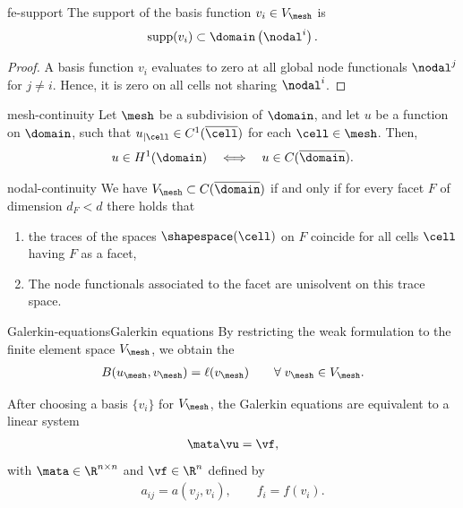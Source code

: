 \begin{Lemma}{fe-support}
  The support of the basis function $v_i\in V_\mesh$ is
  \begin{gather*}
    \operatorname{supp}(v_i) \subset \domain\left(\nodal^i\right).
  \end{gather*}
\end{Lemma}

\begin{proof}
  A basis function $v_i$ evaluates to zero at all global node
  functionals $\nodal^j$ for $j\neq i$. Hence, it is zero on all cells
  not sharing $\nodal^i$.
\end{proof}

\begin{Lemma}{mesh-continuity}
  Let $\mesh$ be a subdivision of $\domain$, and let $u$ be a function
  on $\domain$, such that $u_{|\cell} \in C^1(\overline{\cell})$ for
  each $\cell\in\mesh$. Then,
  \begin{gather}
    u\in H^1(\domain)
    \quad \Longleftrightarrow\quad
    u\in C(\overline\domain).
  \end{gather}
\end{Lemma}

\begin{Lemma}{nodal-continuity}
  We have $V_\mesh\subset C(\overline{\domain})$ if and only if for
  every facet $F$ of dimension $d_F < d$ there holds that
  \begin{enumerate}
  \item the traces of the spaces $\shapespace(\cell)$ on $F$ coincide
    for all cells $\cell$ having $F$ as a facet,
  \item The node functionals associated to the facet are unisolvent on
    this trace space.
  \end{enumerate}
\end{Lemma}

\begin{Definition}{Galerkin-equations}{Galerkin equations}
  By restricting the weak formulation to the finite element space $V_{\mesh}$, we obtain the 
  \begin{gather}
    B(u_{\mesh},v_{\mesh}) = \ell(v_{\mesh}) \qquad\forall\;v_{\mesh}\in V_{\mesh}. 
  \end{gather}
  
  After choosing a basis $\{v_i\}$ for $V_{\mesh}$, the Galerkin equations are
  equivalent to a linear system
  \begin{gather}
    \mata \vu = \vf,
  \end{gather}
  with $\mata\in\R^{n\times n}$ and $\vf\in \R^n$ defined by
  \begin{gather}
    a_{ij} = a(v_j, v_i), \qquad f_i = f(v_i).
  \end{gather}
\end{Definition}

